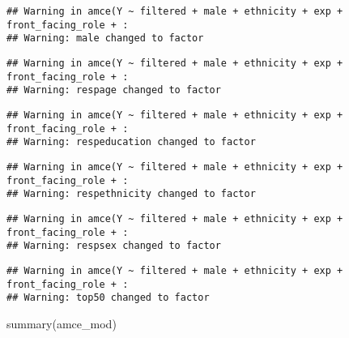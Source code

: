 \documentclass[
]{article}
\newenvironment{Shaded}{\begin{snugshade}}{\end{snugshade}}
\newcommand{\FunctionTok}[1]{\textcolor[rgb]{0.00,0.00,0.00}{#1}}
\newcommand{\NormalTok}[1]{#1}
\begin{document}
\begin{verbatim}
## Warning in amce(Y ~ filtered + male + ethnicity + exp + front_facing_role + :
## Warning: male changed to factor
\end{verbatim}

\begin{verbatim}
## Warning in amce(Y ~ filtered + male + ethnicity + exp + front_facing_role + :
## Warning: respage changed to factor
\end{verbatim}

\begin{verbatim}
## Warning in amce(Y ~ filtered + male + ethnicity + exp + front_facing_role + :
## Warning: respeducation changed to factor
\end{verbatim}

\begin{verbatim}
## Warning in amce(Y ~ filtered + male + ethnicity + exp + front_facing_role + :
## Warning: respethnicity changed to factor
\end{verbatim}

\begin{verbatim}
## Warning in amce(Y ~ filtered + male + ethnicity + exp + front_facing_role + :
## Warning: respsex changed to factor
\end{verbatim}

\begin{verbatim}
## Warning in amce(Y ~ filtered + male + ethnicity + exp + front_facing_role + :
## Warning: top50 changed to factor
\end{verbatim}

\begin{Shaded}
\begin{Highlighting}[]
\FunctionTok{summary}\NormalTok{(amce\_mod)}
\end{Highlighting}
\end{Shaded}
\end{document}
